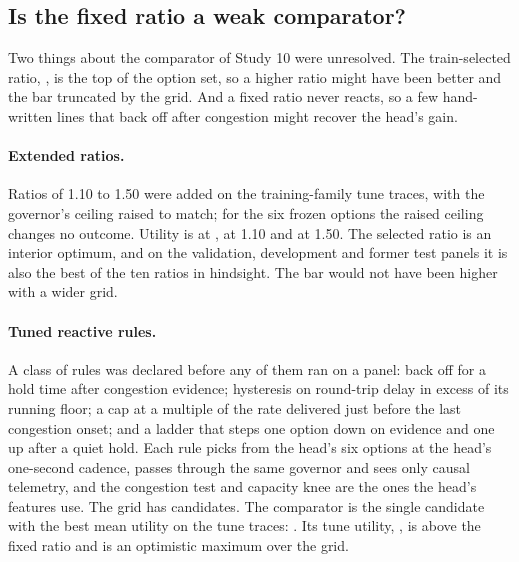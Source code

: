 \documentclass[10pt]{article}
\begin{document}
\subsection{Is the fixed ratio a weak comparator?}
\label{sec:typed-rules}
Two things about the comparator of Study 10 were unresolved. The train-selected ratio, \TypedBroadBaseRatio{}, is the top of the option set, so a higher ratio might have been better and the bar truncated by the grid. And a fixed ratio never reacts, so a few hand-written lines that back off after congestion might recover the head's gain.

\paragraph{Extended ratios.}
Ratios of 1.10 to 1.50 were added on the \TypedRuleTuneTraces{} training-family tune traces, with the governor's ceiling raised to match; for the six frozen options the raised ceiling changes no outcome. Utility is \TypedRuleTuneBase{} at \TypedBroadBaseRatio{}, \TypedRuleTuneAbove{} at 1.10 and \TypedRuleTuneTop{} at 1.50. The selected ratio is an interior optimum, and on the validation, development and former test panels it is also the best of the ten ratios in hindsight. The bar would not have been higher with a wider grid.

\paragraph{Tuned reactive rules.}
A class of rules was declared before any of them ran on a panel: back off for a hold time after congestion evidence; hysteresis on round-trip delay in excess of its running floor; a cap at a multiple of the rate delivered just before the last congestion onset; and a ladder that steps one option down on evidence and one up after a quiet hold. Each rule picks from the head's six options at the head's one-second cadence, passes through the same governor and sees only causal telemetry, and the congestion test and capacity knee are the ones the head's features use. The grid has \TypedRuleCandidates{} candidates. The comparator is the single candidate with the best mean utility on the tune traces: \TypedRuleBestName{}. Its tune utility, \TypedRuleTuneBest{}, is \TypedRuleTuneGain{} above the fixed ratio and is an optimistic maximum over the grid.

\begin{table}[t]
\centering\small
\resizebox{\linewidth}{!}{}
\caption{The tuned reactive rule against the train-selected fixed ratio, and the frozen payoff-weighted RLCD head and the hindsight oracle against the rule. Paired utility differences with family-level 95\% $t$ intervals. The first three panels had been read before the rule class was written; the last is the registered panel of Section~\ref{sec:typed-replication}.}\label{tab:followup-rules}
\end{table}
\end{document}
